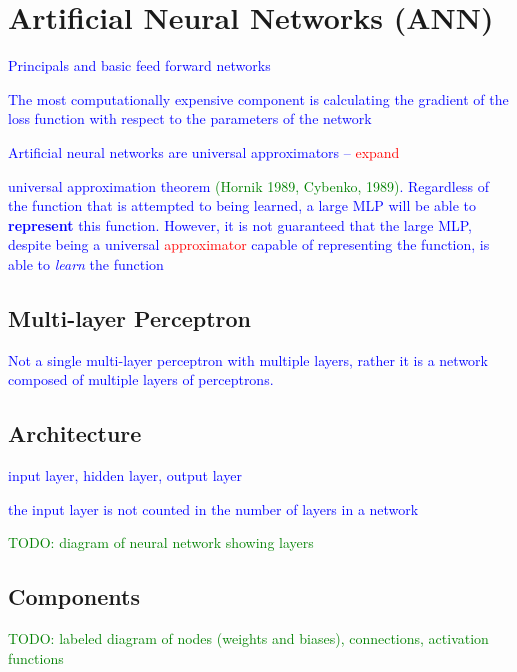 \section{Artificial Neural Networks (ANN)}

\textcolor{blue}{Principals and basic feed forward networks}

\textcolor{blue}{The most computationally expensive component is calculating the gradient of the loss function with respect to the parameters of the network}

\textcolor{blue}{Artificial neural networks are {universal approximators} -- \textcolor{red}{expand}}

\textcolor{blue}{universal approximation theorem \textcolor{green}{(Hornik 1989, Cybenko, 1989)}. Regardless of the function that is attempted to being learned, a large MLP will be able to \textbf{represent} this function. However, it is not guaranteed that the large MLP, despite being a universal \textcolor{red}{approximator} capable of representing the function, is able to \textit{learn} the function}

\subsection{Multi-layer Perceptron}

\textcolor{blue}{Not a single multi-layer perceptron with multiple layers, rather it is a network composed of multiple layers of perceptrons.}

\subsection{Architecture}

\textcolor{blue}{{input layer}, {hidden layer}, {output layer}}

\textcolor{blue}{the input layer is not counted in the number of layers in a network}

\textcolor{green}{TODO: diagram of neural network showing layers}

\subsection{Components}

\textcolor{green}{TODO: labeled diagram of nodes (weights and biases), connections, activation functions}

